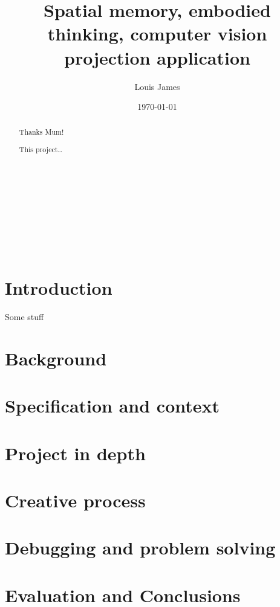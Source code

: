\documentclass[12pt]{book}
\author{Louis James}
\date{\today}
\title{Spatial memory, embodied thinking, computer vision projection application}
\begin{document}
\maketitle

\renewcommand{\abstractname}{Acknowledgements}\\
\begin{abstract}
 Thanks Mum!
\end{abstract}
\newpage\\

\renewcommand{\abstractname}{Abstract}\\
\begin{abstract}
This project\ldots{}\\
\end{abstract}

\tableofcontents\\
\chapter{Introduction}
\label{sec:org3060421}

Some stuff \cite{VictorKayDynamicLand} \\

\chapter{Background}
\label{sec:org674d9f7}
\chapter{Specification and context}
\label{sec:org4f6caa1}
\chapter{Project in depth}
\label{sec:org79f24f6}
\chapter{Creative process}
\label{sec:orgaa04d5d}
\chapter{Debugging and problem solving}
\label{sec:org004cf5e}
\chapter{Evaluation and Conclusions}
\label{sec:orgf4d2a29}
\\
\\
\end{document}
